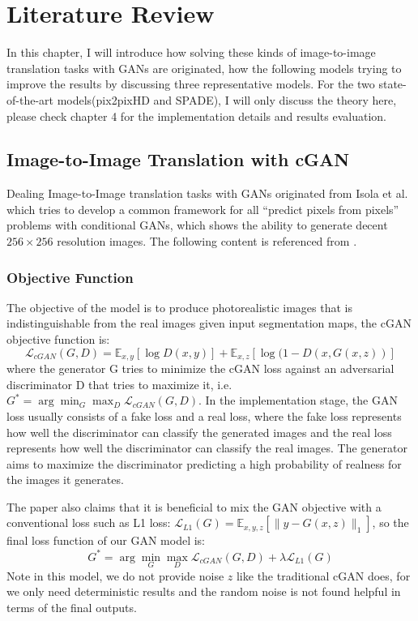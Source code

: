 \chapter{Literature Review}
\label{cha:review}
In this chapter, I will introduce how solving these kinds of image-to-image
translation tasks with GANs are originated, how the following models trying 
to improve the results by discussing three representative models.
For the two state-of-the-art models(pix2pixHD and SPADE), I will only discuss
the theory here, please check chapter 4 for the implementation details and
results evaluation.

\section{Image-to-Image Translation with cGAN}
Dealing Image-to-Image translation tasks with GANs originated from Isola et al.\cite{pix2pix2016}
which tries to develop a common framework for all “predict pixels from pixels” problems with 
conditional GANs, which shows the ability to generate decent $256\times256$ resolution images.
The following content is referenced from \cite{pix2pix2016}. 

\subsection{Objective Function}
The objective of the model is to produce photorealistic images that is indistinguishable from the 
real images given input segmentation maps, the cGAN objective function is:
$$\mathcal{L}_{c G A N}(G, D)=\mathbb{E}_{x, y}[\log D(x, y)]+\mathbb{E}_{x, z}[\log (1-D(x, G(x, z))]$$
where the generator G tries to minimize the cGAN loss against an adversarial discriminator D that 
tries to maximize it, i.e. $G^{*}=\arg \min _{G} \max _{D} \mathcal{L}_{c G A N}(G, D)$.
In the implementation stage, the GAN loss usually consists of a fake loss and a real loss, where 
the fake loss represents how well the discriminator can classify the generated images and 
the real loss represents how well the discriminator can classify the real images. The generator 
aims to maximize the discriminator predicting a high probability of realness for the 
images it generates.


The paper also claims that it is beneficial to mix the GAN objective with a conventional loss 
such as L1 loss: $\mathcal{L}_{L 1}(G)=\mathbb{E}_{x, y, z}\left[\|y-G(x, z)\|_{1}\right]$, so
the final loss function of our GAN model is:
$$G^{*}=\arg \min _{G} \max _{D} \mathcal{L}_{c G A N}(G, D)+\lambda \mathcal{L}_{L 1}(G)$$
Note in this model, we do not provide noise $z$ like the traditional cGAN does, for we only need 
deterministic results and the random noise is not found helpful in terms of the final outputs.

